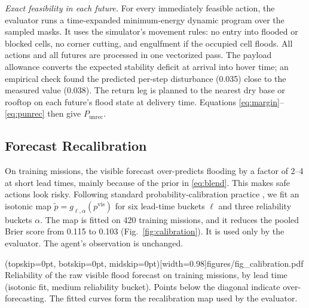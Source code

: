 \documentclass{ieeeaccess}
\newcommand{\Punrec}{P_{\mathrm{unrec}}}
\begin{document}
\emph{Exact feasibility in each future.} For every immediately feasible action, the evaluator runs a time-expanded minimum-energy dynamic program over the sampled masks. It uses the simulator's movement rules: no entry into flooded or blocked cells, no corner cutting, and engulfment if the occupied cell floods. All actions and all futures are processed in one vectorized pass. The payload allowance converts the expected stability deficit at arrival into hover time; an empirical check found the predicted per-step disturbance (0.035) close to the measured value (0.038). The return leg is planned to the nearest dry base or rooftop on each future's flood state at delivery time. Equations \eqref{eq:margin}--\eqref{eq:punrec} then give $\Punrec$.

\subsection{Forecast Recalibration}
On training missions, the visible forecast over-predicts flooding by a factor of 2--4 at short lead times, mainly because of the prior in \eqref{eq:blend}. This makes safe actions look risky. Following standard probability-calibration practice \cite{zadrozny2002,brier1950}, we fit an isotonic map $\tilde p=g_{\ell,\alpha}(p^{\mathrm{vis}})$ for six lead-time buckets $\ell$ and three reliability buckets $\alpha$. The map is fitted on 420 training missions, and it reduces the pooled Brier score from 0.115 to 0.103 (Fig.~\ref{fig:calibration}). It is used only by the evaluator. The agent's observation is unchanged.

\Figure[t!](topskip=0pt, botskip=0pt, midskip=0pt)[width=0.98\columnwidth]{figures/fig_calibration.pdf}
{Reliability of the raw visible flood forecast on training missions, by lead time (isotonic fit, medium reliability bucket). Points below the diagonal indicate over-forecasting. The fitted curves form the recalibration map used by the evaluator.\label{fig:calibration}}
\end{document}
